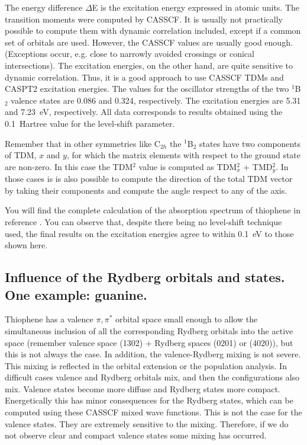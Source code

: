 The energy difference $\Delta$E is the excitation energy expressed in atomic
units. The transition moments were computed by CASSCF. It is usually not practically
possible to compute them with dynamic correlation included, except if a common set
of orbitals are used. However, the CASSCF values are usually good enough.
(Exceptions occur, e.g. close to narrowly avoided crossings or conical intersections).
The excitation energies, on the other hand, are quite sensitive to dynamic
correlation.
Thus, it is a good approach to
use CASSCF TDMs and CASPT2 excitation energies. The values for the oscillator
strengths of the two $^1$B$_2$ valence states are 0.086 and 0.324, respectively.
The excitation energies are 5.31 and 7.23~eV, respectively. All data corresponds
to results obtained using the 0.1~Hartree value for the level-shift parameter.

Remember that in other symmetries like C$_{2h}$ the $^1$B$_2$ states have
two components of TDM, $x$ and $y$, for which the matrix elements with
respect to the ground state are non-zero. In this case the TDM$^2$ value
is computed as TDM$_x^2$ + TMD$_y^2$. In those cases is is also possible to
compute the direction of the total TDM vector by taking their components and
compute the angle respect to any of the axis.

You will find the complete calculation of the absorption spectrum of thiophene 
in reference \cite{Serrano:93a}. You can observe that, despite there being 
no level-shift technique used, the final results on the excitation energies
agree to within 0.1~eV to those shown here.

\subsection{Influence of the Rydberg orbitals and states. One example: guanine.}


Thiophene has a valence $\pi,\pi^*$ orbital space small
enough to allow the simultaneous inclusion of all the corresponding Rydberg orbitals
into the active space (remember valence space (1302) + Rydberg spaces
(0201) or (4020)), but this is not always the case. In addition, the
valence-Rydberg mixing is not severe. This mixing is reflected
in the orbital extension or the population analysis. In difficult cases
valence and Rydberg orbitals mix, and then the configurations also mix.
Valence states become more diffuse and Rydberg states more compact.
Energetically this has minor consequences for the Rydberg states, which
can be computed using these CASSCF mixed wave functions. This is not
the case for the valence states. They are extremely sensitive to the
mixing. Therefore, if we do not observe clear and compact valence states
some mixing has occurred.    

